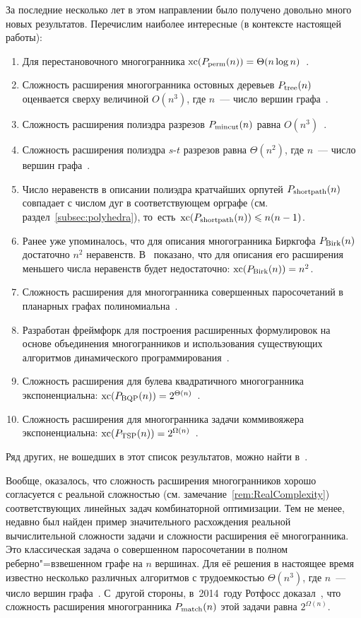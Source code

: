 За последние несколько лет в этом направлении было получено довольно много новых результатов. Перечислим наиболее интересные (в контексте настоящей работы):
\begin{enumerate}
	\item Для перестановочного многогранника $\operatorname{xc}(P_{\textup{perm}}(n)) = \Theta(n \log n)$~\cite{Goemans:2015}.
	\item Сложность расширения многогранника остовных деревьев $P_{\textup{tree}}(n)$ оценвается сверху величиной $O(n^3)$, где $n$~--- число вершин графа~\cite{Wong:1980, Martin:1991}.
	\item Сложность расширения полиэдра разрезов $P_{\textup{mincut}}(n)$ равна $O(n^3)$~\cite{Carr:2009,Conforti:2013}.
	\item Сложность расширения полиэдра $s$-$t$ разрезов равна $\Theta(n^2)$, где $n$~--- число вершин графа~\cite{Garg:1995, Conforti:2013}.
	\item Число неравенств в описании полиэдра кратчайших орпутей $P_{\textup{shortpath}}(n)$ совпадает с числом дуг в соответствующем орграфе (см. раздел~\ref{subsec:polyhedra}), то~есть~$\operatorname{xc}(P_{\textup{shortpath}}(n)) \leqslant n(n-1)$.
	\item Ранее уже упоминалось, что для описания многогранника Биркгофа $P_{\textup{Birk}}(n)$ достаточно $n^2$ неравенств. В~\cite{FioriniKPT:13} показано, что для описания его расширения меньшего числа неравенств будет недостаточно: $\operatorname{xc}(P_{\textup{Birk}}(n)) = n^2$.
	\item Сложность расширения для многогранника совершенных паросочетаний в планарных графах полиномиальна~\cite{Barahona:1993}.
	\item Разработан фреймфорк для построения расширенных формулировок на основе объединения многогранников и использования существующих алгоритмов динамического программирования~\cite{Kaibel:2010}.
	\item Сложность расширения для булева квадратичного многогранника экспоненциальна: $\operatorname{xc}(P_{\textup{BQP}}(n)) = 2^{\Theta(n)}$~\cite{FioriniPokutta:2015, KaibelW:15}.
	\item Сложность расширения для многогранника задачи коммивояжера экспоненциальна: $\operatorname{xc}(P_{\textup{TSP}}(n)) = 2^{\Omega(n)}$~\cite{Rothvoss:2014}.
\end{enumerate}
Ряд других, не вошедших в этот список результатов, можно найти в~\cite{Vanderbeck:2010, Kaibel:2011, Conforti:2013, Laurent:2018}.

Вообще, оказалось, что сложность расширения многогранников хорошо согласуется с 
реальной сложностью (см. замечание~\ref{rem:RealComplexity})
соответствующих линейных задач комбинаторной оптимизации.
Тем не менее, недавно был найден пример значительного расхождения реальной вычислительной сложности задачи и сложности расширения её многогранника. 
Это классическая задача о совершенном паросочетании в полном реберно"=взвешенном графе на $n$ вершинах.
Для её решения в настоящее время известно несколько различных алгоритмов с трудоемкостью $\Theta(n^3)$, где $n$~--- число вершин графа~\cite{Kolmogorov:2009}.
С~другой стороны, в~2014~году Ротфосс доказал~\cite{Rothvoss:2014}, что сложность расширения многогранника $P_{\textup{match}}(n)$ этой задачи равна $2^{\Omega(n)}$.

